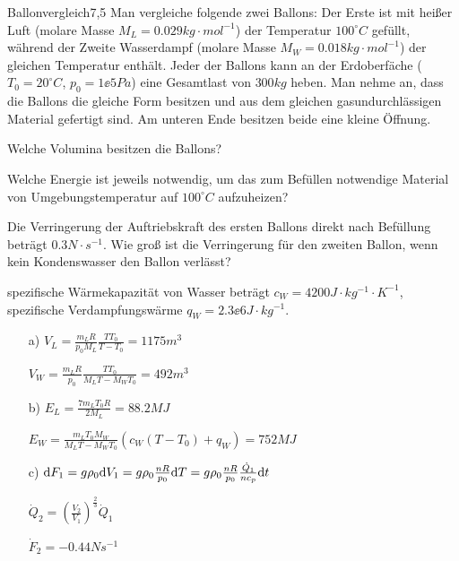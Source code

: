 \begin{problem}{Ballonvergleich}{7,5}
Man vergleiche folgende zwei Ballons: Der Erste ist mit heißer Luft (molare Masse $M_L = 0.029 \unit{kg \cdot mol^{-1}}$) der Temperatur $100^\circ \unit{C}$ gefüllt, während der Zweite Wasserdampf (molare Masse $M_W = 0.018 \unit{kg \cdot mol^{-1}}$) der gleichen Temperatur enthält. Jeder der Ballons kann an der Erdoberfäche ($T_0 = 20^\circ \unit{C}$, $p_0 = 1 \ee{5} \unit{Pa}$) eine Gesamtlast von $300 \unit{kg}$ heben. Man nehme an, dass die Ballons die gleiche Form besitzen und aus dem gleichen gasundurchlässigen Material gefertigt sind. Am unteren Ende besitzen beide eine kleine Öffnung.
\begin{abcenum}
 \item Welche Volumina besitzen die Ballons?
 \item Welche Energie ist jeweils notwendig, um das zum Befüllen notwendige Material von Umgebungstemperatur auf $100^\circ \unit{C}$ aufzuheizen?
 \item Die Verringerung der Auftriebskraft des ersten Ballons direkt nach Befüllung beträgt $0.3 \unit{N \cdot s^{-1}}$. Wie groß ist die Verringerung für den zweiten Ballon, wenn kein Kondenswasser den Ballon verlässt?
\end{abcenum}
\hinweis spezifische Wärmekapazität von Wasser beträgt $c_W = 4200 \unit{J \cdot kg^{-1} \cdot K^{-1}}$, spezifische Verdampfungswärme $q_W = 2.3 \ee{6} \unit{J \cdot kg^{-1}}$.

\begin{solution}
\begin{itemize}
 \item[a)] $V_L = \frac{m_L R}{p_0 M_L}\frac{TT_0}{T-T_0}=1175 \unit{m^3}$
 \item[]   $V_W = \frac{m_L R}{p_0}\frac{TT_0}{M_L T-M_W T_0}=492 \unit{m^3}$
 \item[b)] $E_L = \frac{7 m_L T_0 R}{2 M_L} = 88.2 \unit{MJ}$
 \item[]   $E_W = \frac{m_L T_0 M_W}{M_L T-M_W T_0} (c_W (T-T_0)+q_W) = 752 \unit{MJ}$
 \item[c)] $\mathrm{d} F_1=g \rho_0 \mathrm{d} V_1=g \rho_0 \frac{nR}{p_0} \mathrm{d} T=g \rho_0 \frac{nR}{p_0} \frac{\dot{Q}_1}{n c_p} \mathrm{d} t$
 \item[]   $\dot{Q}_2=\left( \frac{V_2}{V_1} \right)^\frac 23 \dot{Q}_1$
 \item[]   $\dot{F}_2=-0.44 \unit{Ns^{-1}}$
\end{itemize}
\end{solution}
\end{problem}

